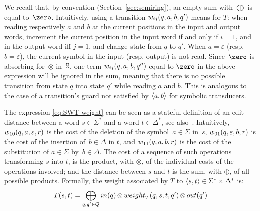 %
We recall that, by convention (Section~\ref{sec:semiring}), 
an empty sum with $\bigoplus$ is equal to~$\zero$. 
%
Intuitively, using a transition $\wei_{ij}(q, a, b, q')$ means for $T$:
when reading respectively $a$ and $b$ at the current positions in the input and output words, 
increment the current position in the input word if and only if $i = 1$, 
and in the output word iff $j = 1$, %
and change state from $q$ to $q'$.
When $a = \varepsilon$ (resp. $b = \varepsilon$), the current symbol 
in the input (resp. output) is not read.
%
%
Since~$\zero$ is absorbing for~$\otimes$ in~$\mathbb{S}$,
one term $\wei_{ij}(q, a, b, q'')$ equal to $\zero$ in the above expression 
will be ignored in the sum, meaning that there is no possible transition
from state $q$ into state $q'$ while reading $a$ and $b$.
This is analogous to the case of a transition's guard not satisfied by $\<a, b>$ for 
symbolic transducers.

%

The expression \eqref{eq:SWT-weight} 
can be seen as a stateful definition of 
an edit-distance between a word $s \in \Sigma^*$ and a word $t \in \Delta^*$,
see also~\cite{Mohri03ijfcs}.
Intuitively, 
$\wei_{10}(q, a, \varepsilon, r)$ is the cost of 
the deletion of the symbol~$a \in \Sigma$ in~$s$, 
$\wei_{01}(q, \varepsilon, b, r)$ is the cost 
of the insertion of~$b \in \Delta$ in $t$, 
and $\wei_{11}(q, a, b, r)$ is the cost 
of the substitution of  $a \in \Sigma$ by~$b \in \Delta$.
%
The cost of a sequence of such operations transforming $s$ into $t$, 
is the product, with $\otimes$, of the individual costs of the operations involved;
and the distance between $s$ and $t$ is the sum, with $\oplus$,
of all possible products.
%
\medskip\noindent
Formally, the weight associated by $T$ to $\< s, t> \in \Sigma^* \times \Delta^*$ is: 
\begin{equation}
T(s, t)  = 
\displaystyle\bigoplus_{q, q' \in Q} \init(q) 
\mathop{\otimes} \weight_T(q, s, t, q') \mathop{\otimes} \final(q')
\label{eq:SWT-value}
\end{equation}

